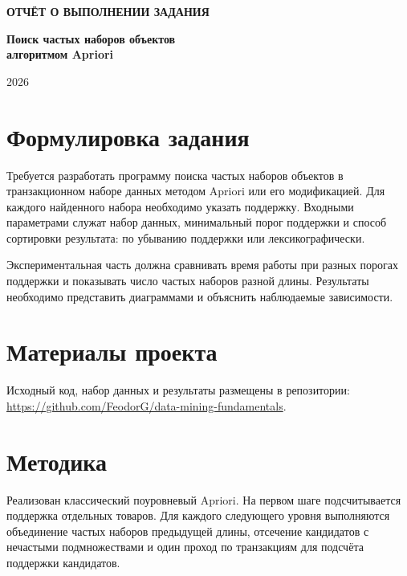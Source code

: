 \documentclass[12pt,a4paper]{article}
\begin{document}
\begin{titlepage}
  \centering
  \vspace*{3cm}
  {\Huge\bfseries ОТЧЁТ О ВЫПОЛНЕНИИ ЗАДАНИЯ\par}
  \vspace{1cm}
  {\LARGE\color{accent}\bfseries Поиск частых наборов объектов\\алгоритмом Apriori\par}
  \vspace{3cm}
  \vfill
  {2026\par}
\end{titlepage}

\section{Формулировка задания}

Требуется разработать программу поиска частых наборов объектов в транзакционном наборе данных методом Apriori или его модификацией. Для каждого найденного набора необходимо указать поддержку. Входными параметрами служат набор данных, минимальный порог поддержки и способ сортировки результата: по убыванию поддержки или лексикографически.

Экспериментальная часть должна сравнивать время работы при разных порогах поддержки и показывать число частых наборов разной длины. Результаты необходимо представить диаграммами и объяснить наблюдаемые зависимости.

\section{Материалы проекта}

Исходный код, набор данных и результаты размещены в репозитории:
\url{https://github.com/FeodorG/data-mining-fundamentals}.

\section{Методика}

Реализован классический поуровневый Apriori. На первом шаге подсчитывается поддержка отдельных товаров. Для каждого следующего уровня выполняются объединение частых наборов предыдущей длины, отсечение кандидатов с нечастыми подмножествами и один проход по транзакциям для подсчёта поддержки кандидатов.
\end{document}
